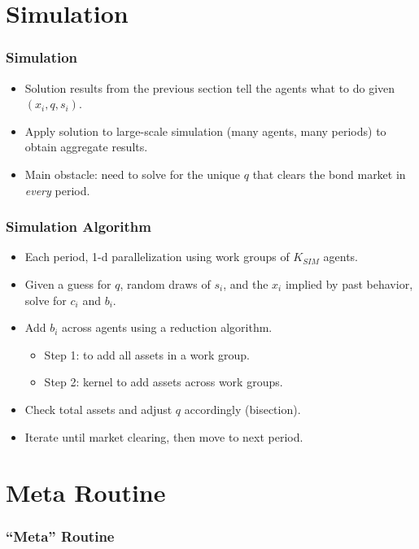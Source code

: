 \documentclass[handout]{beamer}
\theoremstyle{definition}
\begin{document}
\section{Simulation}

\begin{frame}
  \frametitle{Simulation}
  \begin{itemize}
  \item Solution results from the previous section tell the agents what to do given $(x_i, q, s_i)$.
  \item Apply solution to large-scale simulation (many agents, many periods) to obtain aggregate results.
  \item Main obstacle: need to solve for the unique $q$ that clears the bond market in \emph{every} period.
  \end{itemize}
\end{frame}

\begin{frame}
  \frametitle{Simulation Algorithm}
  \begin{itemize}
  \item Each period, 1-d parallelization using work groups of $K_{SIM}$ agents.
  \item Given a guess for $q$, random draws of $s_i$, and the $x_i$ implied by past behavior, solve for $c_i$ and $b_i$.
  \item Add $b_i$ across agents using a reduction algorithm.
    \begin{itemize}
    \item Step 1: to add all assets in a work group.
    \item Step 2: kernel to add assets across work groups.
    \end{itemize}
  \item Check total assets and adjust $q$ accordingly (bisection).
  \item Iterate until market clearing, then move to next period.
  \end{itemize}
\end{frame}

\section{Meta Routine}

\begin{frame}
  \frametitle{``Meta'' Routine}
  \begin{itemize}
  \item All the previous steps assumed a guess for $\tilde{q}(z)$, the average bond price in each macro ($z$) state.
  \item Want these expectations to be unbiased.
  \item Starting with some guess for $\tilde{q}$, run the entire algorithm, and calculate sample means of bond prices in each $z$ state.
  \item If sample means match $\tilde{q}$ within tolerance, you are done.
  \item Otherwise, restart the routine using the previous sample means as $\tilde{q}$.
  \end{itemize}
\end{frame}
\end{document}
